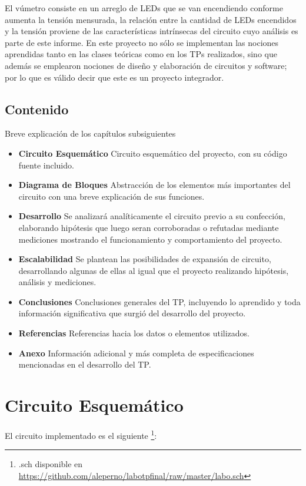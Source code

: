 \documentclass[12pt,a4paper]{article}
\begin{document}
		El vúmetro consiste en un arreglo de LEDs que se van encendiendo conforme aumenta la tensión mensurada, la relación entre la cantidad de LEDs encendidos y la tensión proviene de las características intrínsecas del circuito cuyo análisis es parte de este informe. En este proyecto no sólo se implementan las nociones aprendidas tanto en las clases teóricas  como en los TPs realizados, sino que además se emplearon nociones de diseño y elaboración de circuitos y software; por lo que es válido decir que este es un proyecto integrador.

	\subsection{Contenido}
		Breve explicación de los capítulos subsiguientes
		\begin{itemize}
			\item \textbf{Circuito Esquemático} Circuito esquemático del proyecto, con su código fuente incluido.
			\item \textbf{Diagrama de Bloques} Abstracción de los elementos más importantes del circuito con una breve explicación de sus funciones.
			\item \textbf{Desarrollo} Se analizará analíticamente el circuito previo a su confección, elaborando hipótesis que luego seran corroboradas o refutadas mediante mediciones mostrando el funcionamiento y comportamiento del proyecto.
			\item \textbf{Escalabilidad} Se plantean las posibilidades de expansión de circuito, desarrollando algunas de ellas al igual que el proyecto realizando hipótesis, análisis y mediciones.
			\item \textbf{Conclusiones} Conclusiones generales del TP, incluyendo lo aprendido y toda información significativa que surgió del desarrollo del proyecto.
			\item \textbf{Referencias} Referencias hacia los datos o elementos utilizados.
			\item \textbf{Anexo} Información adicional y más completa de especificaciones mencionadas en el desarrollo del TP.
		\end{itemize}

	\newpage
	\section{Circuito Esquemático}
		El circuito implementado es el siguiente \footnote{.sch disponible en \url{https://github.com/aleperno/labotpfinal/raw/master/labo.sch}}:
\end{document}
